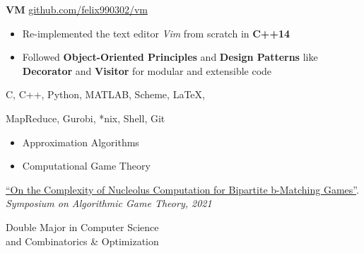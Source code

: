 \documentclass[11pt,a4paper]{altacv}
\begin{document}
\begin{paracol}{2}
\iffalse
\cvevent{Pleter}{}{May 2019}{\href{https://github.com/felix990302/word\_completion}{github.com/felix990302/word\_completion}}
\begin{itemize}
    \item Designed a concurrent auto-completion engine using a variation of \textbf{range trees} consisting of a \textbf{compressed trie} and sorted arrays in \textbf{C++}
    \item Accounted for race conditions and deadlocks using fine-grained read-write lock hierarchies
    \item Incorporated \textbf{gprof} as profiler for optimizations including a static \textbf{fixed-size allocator} to achieve \textbf{20x} speedup
\end{itemize}

\divider
\fi
\textbf{VM}
\hfill\href{https://github.com/felix990302/vm}{\faExternalLink* github.com/felix990302/vm}
\smallskip
\begin{itemize}
    \item Re-implemented the text editor \emph{Vim} from scratch in \textbf{C++14}
    \item Followed \textbf{Object-Oriented Principles} and \textbf{Design Patterns} like \textbf{Decorator} and \textbf{Visitor} for modular and extensible code
\end{itemize}

\switchcolumn

C, C++, Python, MATLAB, Scheme, \LaTeX,

\smallskip

MapReduce, Gurobi, *nix, Shell, Git

\begin{itemize}
  \item Approximation Algorithms
  \item Computational Game Theory
\end{itemize}

\href{https://arxiv.org/abs/2105.07161}{\faExternalLink* ``On the Complexity of Nucleolus Computation for Bipartite b-Matching Games''}.
\emph{Symposium on Algorithmic Game Theory, 2021}


Double Major in Computer Science\\
and Combinatorics \& Optimization


\end{paracol}
\end{document}
